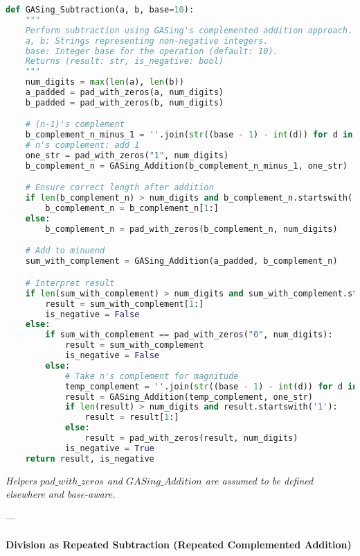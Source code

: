 \begin{lstlisting}[language=Python,caption={GASing\_Subtraction Algorithm}]
def GASing_Subtraction(a, b, base=10):
    """
    Perform subtraction using GASing's complemented addition approach.
    a, b: Strings representing non-negative integers.
    base: Integer base for the operation (default: 10).
    Returns (result: str, is_negative: bool)
    """
    num_digits = max(len(a), len(b))
    a_padded = pad_with_zeros(a, num_digits)
    b_padded = pad_with_zeros(b, num_digits)

    # (n-1)'s complement
    b_complement_n_minus_1 = ''.join(str((base - 1) - int(d)) for d in b_padded)
    # n's complement: add 1
    one_str = pad_with_zeros("1", num_digits)
    b_complement_n = GASing_Addition(b_complement_n_minus_1, one_str)

    # Ensure correct length after addition
    if len(b_complement_n) > num_digits and b_complement_n.startswith('1'):
        b_complement_n = b_complement_n[1:]
    else:
        b_complement_n = pad_with_zeros(b_complement_n, num_digits)

    # Add to minuend
    sum_with_complement = GASing_Addition(a_padded, b_complement_n)

    # Interpret result
    if len(sum_with_complement) > num_digits and sum_with_complement.startswith('1'):
        result = sum_with_complement[1:]
        is_negative = False
    else:
        if sum_with_complement == pad_with_zeros("0", num_digits):
            result = sum_with_complement
            is_negative = False
        else:
            # Take n's complement for magnitude
            temp_complement = ''.join(str((base - 1) - int(d)) for d in pad_with_zeros(sum_with_complement, num_digits))
            result = GASing_Addition(temp_complement, one_str)
            if len(result) > num_digits and result.startswith('1'):
                result = result[1:]
            else:
                result = pad_with_zeros(result, num_digits)
            is_negative = True
    return result, is_negative
\end{lstlisting}

\emph{Helpers \texttt{$pad\_with\_{zeros}$} and \texttt{$GASing\_{Addition}$} are assumed to be defined elsewhere and base-aware.}

---
\paragraph{Division as Repeated Subtraction (Repeated Complemented Addition)}

